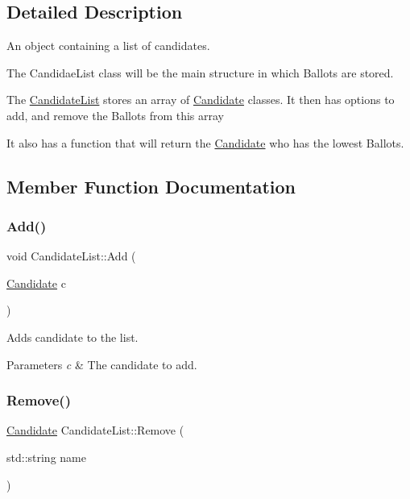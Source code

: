 \subsection{Detailed Description}
An object containing a list of candidates. 


\begin{DoxyItemize}
\item The Candidae\+List class will be the main structure in which Ballots are stored.
\item The \mbox{\hyperlink{class_candidate_list}{Candidate\+List}} stores an array of \mbox{\hyperlink{class_candidate}{Candidate}} classes. It then has options to add, and remove the Ballots from this array
\item It also has a function that will return the \mbox{\hyperlink{class_candidate}{Candidate}} who has the lowest Ballots. 
\end{DoxyItemize}

\subsection{Member Function Documentation}
\mbox{\label{class_candidate_list_a36a07e05ada013fdb02f5b81badc1cc3}} 
\subsubsection{\texorpdfstring{Add()}{Add()}}
{\footnotesize\ttfamily void Candidate\+List\+::\+Add (\begin{DoxyParamCaption}\item[{\mbox{\hyperlink{class_candidate}{Candidate}}}]{c }\end{DoxyParamCaption})}



Adds candidate to the list. 


\begin{DoxyParams}{Parameters}
{\em c} & The candidate to add. \\
\hline
\end{DoxyParams}
\mbox{\label{class_candidate_list_a566cced2b1375525a5bc86686d0e4a7e}} 
\subsubsection{\texorpdfstring{Remove()}{Remove()}}
{\footnotesize\ttfamily \mbox{\hyperlink{class_candidate}{Candidate}} Candidate\+List\+::\+Remove (\begin{DoxyParamCaption}\item[{std\+::string}]{name }\end{DoxyParamCaption})}



